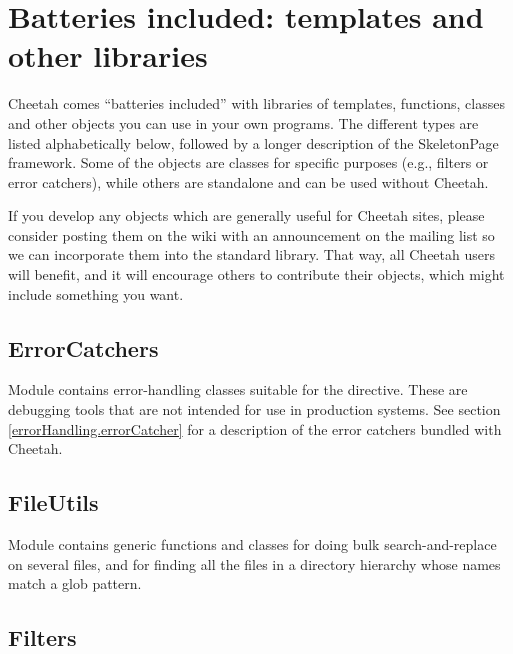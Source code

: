 \section{Batteries included: templates and other libraries}
\label{libraries}

Cheetah comes ``batteries included'' with libraries of templates, functions,
classes and other objects you can use in your own programs.  The different
types are listed alphabetically below, followed by a longer description of
the SkeletonPage framework.  Some of the objects are classes for specific
purposes (e.g., filters or error catchers), while others are standalone and
can be used without Cheetah.

If you develop any objects which are generally useful for Cheetah sites,
please consider posting them on the wiki with an announcement on the mailing
list so we can incorporate them into the standard library.  That way, all
Cheetah users will benefit, and it will encourage others to contribute their
objects, which might include something you want.

\subsection{ErrorCatchers}
\label{libraries.ErrorCatchers}

Module  contains error-handling classes suitable for
the  directive.  These are debugging tools that are not
intended for use in production systems. See section
\ref{errorHandling.errorCatcher} for a description of the error catchers bundled
with Cheetah.


\subsection{FileUtils}
\label{libraries.FileUtils}

Module  contains generic functions and classes for 
doing bulk search-and-replace on several files, and for finding all the files
in a directory hierarchy whose names match a glob pattern.

\subsection{Filters}
\label{libraries.Filters}

